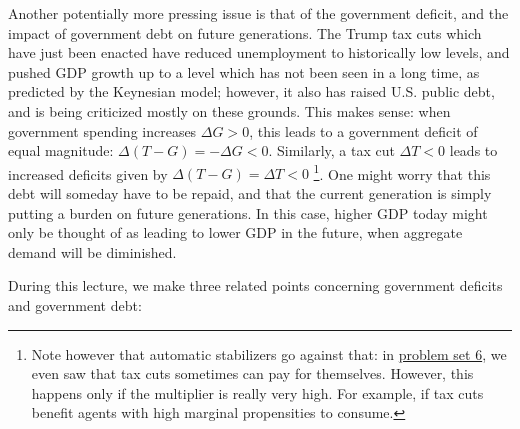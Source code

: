 \documentclass[]{book}
\let\rmarkdownfootnote\footnote%
\def\footnote{\protect\rmarkdownfootnote}
\theoremstyle{definition}
\theoremstyle{definition}
\theoremstyle{definition}
\theoremstyle{remark}
\begin{document}
Another potentially more pressing issue is that of the government
deficit, and the impact of government debt on future generations. The
Trump tax cuts which have just been enacted have reduced unemployment to
historically low levels, and pushed GDP growth up to a level which has
not been seen in a long time, as predicted by the Keynesian model;
however, it also has raised U.S. public debt, and is being criticized
mostly on these grounds. This makes sense: when government spending
increases \(\Delta G>0\), this leads to a government deficit of equal
magnitude: \(\Delta (T-G) = -\Delta G<0.\) Similarly, a tax cut
\(\Delta T<0\) leads to increased deficits given by
\(\Delta (T-G) = \Delta T<0\) \footnote{Note however that automatic
  stabilizers go against that: in \href{pset6.html}{problem set 6}, we
  even saw that tax cuts sometimes can pay for themselves. However, this
  happens only if the multiplier is really very high. For example, if
  tax cuts benefit agents with high marginal propensities to consume.}.
One might worry that this debt will someday have to be repaid, and that
the current generation is simply putting a burden on future generations.
In this case, higher GDP today might only be thought of as leading to
lower GDP in the future, when aggregate demand will be diminished.

During this lecture, we make three related points concerning government
deficits and government debt:
\end{document}
